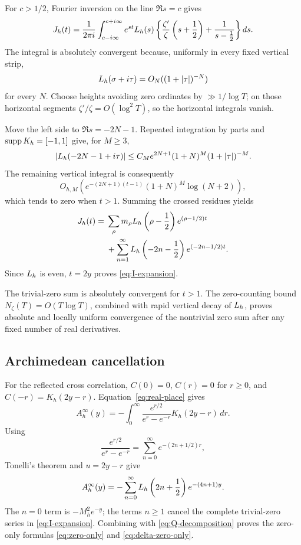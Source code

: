 For \(c>1/2\), Fourier inversion on the line \(\Re s=c\) gives
\[
J_h(t)
=
\frac{1}{2\pi i}\int_{c-i\infty}^{c+i\infty}
e^{st}L_h(s)
\left\{
\frac{\zeta'}{\zeta}\left(s+\frac12\right)
+\frac{1}{s-\frac12}
\right\}ds.
\]
The integral is absolutely convergent because, uniformly in every fixed
vertical strip,
\[
L_h(\sigma+i\tau)=O_N((1+|\tau|)^{-N})
\]
for every \(N\).  Choose heights avoiding zero ordinates by
\(\gg1/\log T\); on those horizontal segments
\(\zeta'/\zeta=O(\log^2T)\), so the horizontal integrals vanish.

Move the left side to \(\Re s=-2N-1\).  Repeated integration by parts and
\(\operatorname{supp} K_h=[-1,1]\) give, for \(M\ge3\),
\[
|L_h(-2N-1+i\tau)|
\le
C_Me^{2N+1}(1+N)^M(1+|\tau|)^{-M}.
\]
The remaining vertical integral is consequently
\[
O_{h,M}\left(
e^{-(2N+1)(t-1)}(1+N)^M\log(N+2)
\right),
\]
which tends to zero when \(t>1\).  Summing the crossed residues yields
\begin{align}
J_h(t)
={}&
\sum_\rho m_\rho
L_h\left(\rho-\frac12\right)
e^{(\rho-1/2)t}
\notag\\
&+
\sum_{n=1}^{\infty}
L_h\left(-2n-\frac12\right)e^{(-2n-1/2)t}.
\label{eq:J-explicit}
\end{align}
Since \(L_h\) is even, \(t=2y\) proves
\eqref{eq:I-expansion}.

The trivial-zero sum is absolutely convergent for \(t>1\).  The zero-counting
bound \(N_\zeta(T)=O(T\log T)\), combined with rapid vertical decay of
\(L_h\), proves absolute and locally uniform convergence of the nontrivial
zero sum after any fixed number of real derivatives.

\subsection{Archimedean cancellation}

For the reflected cross correlation, \(C(0)=0\), \(C(r)=0\) for \(r\ge0\),
and \(C(-r)=K_h(2y-r)\).  Equation~\eqref{eq:real-place} gives
\[
A_h^\infty(y)
=-\int_0^\infty
\frac{e^{r/2}}{e^r-e^{-r}}K_h(2y-r)\,dr.
\]
Using
\[
\frac{e^{r/2}}{e^r-e^{-r}}
=\sum_{n=0}^{\infty}e^{-(2n+1/2)r},
\]
Tonelli's theorem and \(u=2y-r\) give
\[
A_h^\infty(y)
=-\sum_{n=0}^{\infty}
L_h\left(2n+\frac12\right)e^{-(4n+1)y}.
\]
The \(n=0\) term is \(-M_h^2e^{-y}\); the terms \(n\ge1\) cancel the
complete trivial-zero series in \eqref{eq:I-expansion}.  Combining with
\eqref{eq:Q-decomposition} proves the zero-only formulas
\eqref{eq:zero-only} and \eqref{eq:delta-zero-only}.
